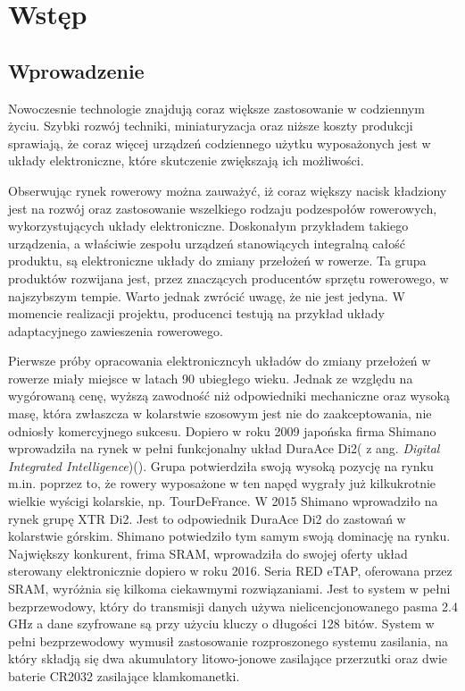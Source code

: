 \chapter{Wstęp}
\label{cha:Wstęp}

\section{Wprowadzenie}
\label{sec:Wprowadzenie}
Nowoczesnie technologie znajdują coraz większe zastosowanie w codziennym życiu. Szybki rozwój techniki, miniaturyzacja oraz niższe koszty produkcji sprawiają, że coraz więcej urządzeń codziennego użytku wyposażonych jest w układy elektroniczne, które skutczenie zwiększają ich możliwości. 

Obserwując rynek rowerowy można zauważyć, iż coraz większy nacisk kładziony jest na rozwój oraz zastosowanie wszelkiego rodzaju podzespołów rowerowych, wykorzystujących układy elektroniczne. Doskonałym przykładem takiego urządzenia, a właściwie zespołu urządzeń stanowiących integralną całość produktu, są elektroniczne układy do zmiany przełożeń w rowerze. Ta grupa produktów rozwijana jest, przez znaczących producentów sprzętu rowerowego, w najszybszym tempie. Warto jednak zwrócić uwagę, że nie jest jedyna. W momencie realizacji projektu, producenci testują na przykład układy adaptacyjnego zawieszenia rowerowego.   

Pierwsze próby opracowania elektroniczncyh układów do zmiany przełożeń w rowerze miały miejsce w latach 90 ubiegłego wieku. Jednak ze względu na wygórowaną cenę, wyższą zawodność niż odpowiedniki mechaniczne oraz wysoką masę, która zwłaszcza w kolarstwie szosowym jest nie do zaakceptowania, nie odniosły komercyjnego sukcesu. Dopiero w roku 2009 japońska firma Shimano wprowadziła na rynek w pełni funkcjonalny układ DuraAce Di2( z ang. {\em Digital Integrated Intelligence})(\cite{Dil00}). Grupa potwierdziła swoją wysoką pozycję na rynku m.in. poprzez to, że rowery wyposażone w ten napęd wygrały już kilkukrotnie wielkie wyścigi kolarskie, np. TourDeFrance. W 2015 Shimano wprowadziło na rynek grupę XTR Di2. Jest to odpowiednik DuraAce Di2 do zastowań w kolarstwie górskim. Shimano potwiedziło tym samym swoją dominację na rynku. Największy konkurent, frima SRAM, wprowadziła do swojej oferty układ sterowany elektronicznie dopiero w roku 2016. Seria RED eTAP, oferowana przez SRAM, wyróżnia się kilkoma ciekawmymi rozwiązaniami. Jest to system w pełni bezprzewodowy, który do transmisji danych używa nielicencjonowanego pasma 2.4 GHz a dane szyfrowane są przy użyciu kluczy o długości 128 bitów. System w pełni bezprzewodowy wymusił zastosowanie rozproszonego systemu zasilania, na który składją się dwa akumulatory litowo-jonowe zasilające przerzutki oraz dwie baterie CR2032 zasilające klamkomanetki\cite{bikeWorld.pl}.

